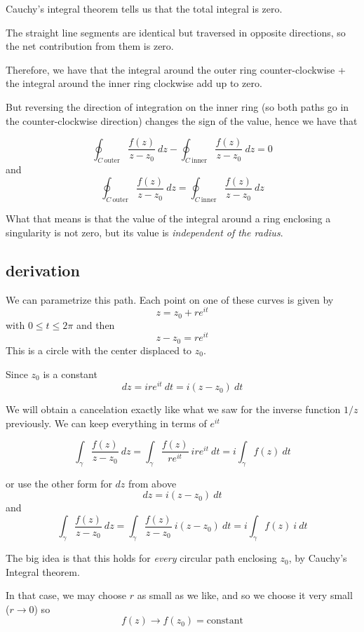 \documentclass[11pt, oneside]{article}
\begin{document}
Cauchy's integral theorem tells us that the total integral is zero.

The straight line segments are identical but traversed in opposite directions, so the net contribution from them is zero.

Therefore, we have that the integral around the outer ring counter-clockwise + the integral around the inner ring clockwise add up to zero.

But reversing the direction of integration on the inner ring (so both paths go in the counter-clockwise direction) changes the sign of the value, hence we have that

\[ \oint_{C \ \text{outer}} \frac{f(z)}{z-z_0} \ dz - \oint_{C \ \text{inner}} \frac{f(z)}{z-z_0} \ dz = 0 \]
and
\[ \oint_{C \ \text{outer}} \frac{f(z)}{z-z_0} \ dz = \oint_{C \ \text{inner}} \frac{f(z)}{z-z_0} \ dz \]

What that means is that the value of the integral around a ring enclosing a singularity is not zero, but its value is \emph{independent of the radius}.

\subsection*{derivation}

We can parametrize this path.  Each point on one of these curves is given by
\[ z = z_0 + r e^{it} \]
with $0 \le t \le 2 \pi$ and then
\[ z - z_0 = r e^{it} \]
This is a circle with the center displaced to $z_0$.

Since $z_0$ is a constant
\[ dz = i r e^{it} \ dt = i (z - z_0) \ dt \]

We will obtain a cancelation exactly like what we saw for the inverse function $1/z$ previously.  We can keep everything in terms of $e^{it}$

\[ \int_{\gamma} \frac{f(z)}{z - z_0} \ dz = \int_{\gamma} \frac{f(z)}{re^{it}} \ ire^{it} \ dt = i \int_{\gamma} f(z) \ dt \]

or use the other form for $dz$ from above
\[ dz = i (z - z_0) \ dt \]
and
\[ \int_{\gamma} \frac{f(z)}{z - z_0} \ dz = \int_{\gamma} \frac{f(z)}{z - z_0} \ i(z - z_0) \ dt = i \int_{\gamma} f(z) \ i \ dt \]

The big idea is that this holds for \emph{every} circular path enclosing $z_0$, by Cauchy's Integral theorem.  

In that case, we may choose $r$ as small as we like, and so we choose it very small ($r \rightarrow 0$) so
\[ f(z) \rightarrow f(z_0) = \text{constant} \]
\end{document}
